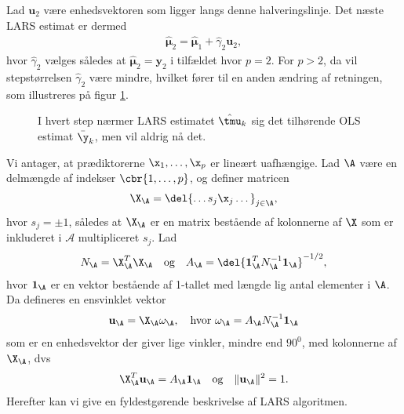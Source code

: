 Lad $\mathbf{u}_2$ være enhedsvektoren som ligger langs denne halveringslinje.
Det næste LARS estimat er dermed
\begin{align*}
\widehat{\boldsymbol{\mu}}_2 = \widehat{\boldsymbol{\mu}}_1+ \widehat{\gamma}_2 \mathbf{u}_2,
\end{align*}
hvor $\widehat{\gamma}_2$ vælges således at $\widehat{\boldsymbol{\mu}}_2 = \textbf{y}_2$ i tilfældet hvor $p = 2$. 
For \(p>2\), da vil stepstørrelsen \(\widehat{\gamma}_2\) være mindre, hvilket fører til en anden ændring af retningen, som illustreres på figur \ref{fig:lars2}.
%
\begin{figure}[H]
\centering
\scalebox{0.8}{}
\caption{I hvert step nærmer LARS estimatet \(\hat{\tmu}_k\) sig det tilhørende OLS estimat \(\bar{\y}_k\), men vil aldrig nå det.
 }\label{fig:lars2}
\end{figure}
%
Vi antager, at prædiktorerne \(\x_1, \ldots, \x_p\) er lineært uafhængige.
Lad \(\A\) være en delmængde af indekser \(\cbr{1,\ldots, p}\), og definer matricen
\begin{align}
\X_\A = \del{\dots s_j \x_j \dots}_{j \in \A}, \label{eq:lars_2.4}
\end{align}
hvor  $s_j = \pm 1$, således at \(\X_\A\) er en matrix bestående af kolonnerne af \(\X\) som er inkluderet i \(\mathcal{A}\) multipliceret \(s_j\).
Lad 
\begin{align}
N_\A = \X_\A^T \X_\A \quad \text{og} \quad A_\A = \del{\mathbf{1}_\A^T N_\A^{-1} \mathbf{1}_\A}^{-1/2}, \label{eq:lars_2.5}
\end{align}
hvor \(\mathbf{1}_\A\) er en vektor bestående af 1-tallet med længde lig antal elementer i \(\A\).
Da defineres en ensvinklet vektor
\begin{align}
\mathbf{u}_\A = \X_\A \omega_\A, \quad \text{hvor } \omega_\A = A_\A N_\A^{-1} \mathbf{1}_\A \label{eq:lars_2.6}
\end{align}
som er en enhedsvektor der giver lige vinkler, mindre end \(90^0\), med kolonnerne af \(\X_\A\), dvs
\begin{align}
\X_\A^T \mathbf{u}_\A = A_\A \mathbf{1}_\A \quad \text{og} \quad \Vert \mathbf{u}_\A \Vert^2 = 1. \label{eq:lars_2.7}
\end{align}
Herefter kan vi give en fyldestgørende beskrivelse af LARS algoritmen.
%
